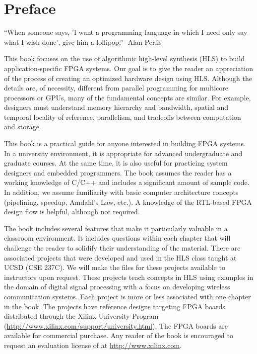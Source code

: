 
\chapter*{Preface}
\begin{aside}
``When someone says, 'I want a programming language in which I need only say what I wish done', give him a lollipop.'' -Alan Perlis
\end{aside}

This book focuses on the use of algorithmic high-level synthesis (HLS) to build application-specific FPGA systems.  Our goal is to give the reader an appreciation of the process of creating an optimized hardware design using HLS. Although the details are, of necessity, different from parallel programming for multicore processors or GPUs, many of the fundamental concepts are similar.  For example, designers must understand memory hierarchy and bandwidth, spatial and temporal locality of reference, parallelism, and tradeoffs between computation and storage.

This book is a practical guide for anyone interested in building FPGA systems.  In a university environment, it is appropriate for advanced undergraduate and graduate courses.  At the same time, it is also useful for practicing system designers and embedded programmers.  The book assumes the reader has a working knowledge of C/C++ and includes a significant amount of sample code. In addition, we assume familiarity with basic computer architecture concepts (pipelining, speedup, Amdahl's Law, etc.).  A knowledge of the RTL-based FPGA design flow is helpful, although not required.

The book includes several features that make it particularly valuable in a classroom environment.  It includes questions within each chapter that will challenge the reader to solidify their understanding of the material.  There are associated projects that were developed and used in the HLS class taught at UCSD (CSE 237C). We will make the files for these projects available to instructors upon request. These projects teach concepts in HLS using examples in the domain of digital signal processing with a focus on developing wireless communication systems. Each project is more or less associated with one chapter in the book. The projects have reference designs targeting FPGA boards distributed through the Xilinx University Program (\url{http://www.xilinx.com/support/university.html}).   The FPGA boards are available for commercial purchase.  Any reader of the book is encouraged to request an evaluation license of \VHLS at \url{http://www.xilinx.com}.

